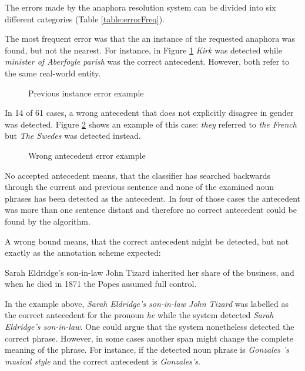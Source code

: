 The errors made by the anaphora resolution system can be divided into six different categories (Table \ref{table:errorFreq}).


The most frequent error was that the an instance of the requested anaphora was found, but not the nearest. For instance, in Figure \ref{figure:prevInstError} \textit{Kirk} was detected while \textit{minister of Aberfoyle parish} was the correct antecedent. However, both refer to the same real-world entity.

\begin{figure}[h]
\centering
\caption{Previous instance error example}
	\label{figure:prevInstError}
\end{figure}

In 14 of 61 cases, a wrong antecedent that does not explicitly disagree in gender was detected. Figure \ref{figure:wrongAnteError} shows an example of this case: \textit{they} referred to \textit{the French} but \textit{The Swedes} was detected instead. %

\begin{figure}[h]
\centering
\caption{Wrong antecedent error example}
	\label{figure:wrongAnteError}
\end{figure}

No accepted antecedent means, that the classifier has searched backwards through the current and previous sentence and none of the examined noun phrases has been detected as the antecedent. In four of those cases the antecedent was more than one sentence distant and therefore no correct antecedent could be found by the algorithm. 

A wrong bound means, that the correct antecedent might be detected, but not exactly as the annotation scheme expected:
\begin{addmargin}[25pt]{25pt}
Sarah Eldridge's son-in-law John Tizard inherited her share of the business, and when he died in 1871 the Popes assumed full control.
\end{addmargin}
In the example above, \textit{Sarah Eldridge's son-in-law John Tizard} was labelled as the correct antecedent for the pronoun \textit{he} while the system detected \textit{Sarah Eldridge's son-in-law}. One could argue that the system nonetheless detected the correct phrase. However, in some cases another span might change the complete meaning of the phrase. For instance,  if the detected noun phrase is \textit{Gonzales 's musical style} and the correct antecedent is \textit{Gonzales's}.


